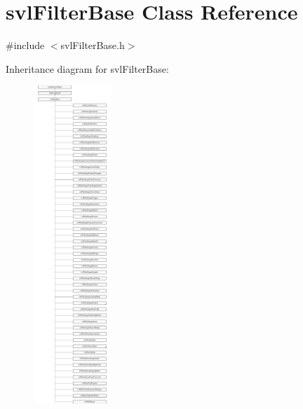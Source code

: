 \hypertarget{classsvl_filter_base}{}\section{svl\+Filter\+Base Class Reference}
\label{classsvl_filter_base}


{\ttfamily \#include $<$svl\+Filter\+Base.\+h$>$}

Inheritance diagram for svl\+Filter\+Base\+:\begin{figure}[H]
\begin{center}
\leavevmode
\includegraphics[height=12.000000cm]{de/d68/classsvl_filter_base}
\end{center}
\end{figure}
